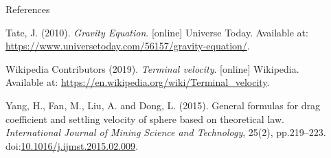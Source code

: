 \documentclass[final]{beamer}
\newlength{\sepwidth}
\newlength{\colwidth}
\newcommand{\separatorcolumn}{\begin{column}{\sepwidth}\end{column}}
\begin{document}
\begin{frame}[t]
\begin{columns}[t]
\begin{column}{\colwidth}
\begin{block}{References}
\begin{thebibliography}{9}
Tate, J. (2010). \emph{Gravity Equation}. [online] Universe Today. Available at: \url{https://www.universetoday.com/56157/gravity-equation/}.

Wikipedia Contributors (2019). \emph{Terminal velocity}. [online] Wikipedia. Available at: \url{https://en.wikipedia.org/wiki/Terminal_velocity}.

Yang, H., Fan, M., Liu, A. and Dong, L. (2015). General formulas for drag coefficient and settling velocity of sphere based on theoretical law. \emph{International Journal of Mining Science and Technology}, 25(2), pp.219–223. doi:\href{https://doi.org/10.1016/j.ijmst.2015.02.009}{10.1016/j.ijmst.2015.02.009}.
\end{thebibliography}

  \end{block}

\end{column}

\separatorcolumn
\end{columns}
\end{frame}
\end{document}
